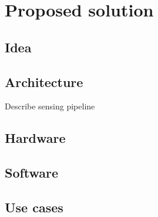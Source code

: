 
\chapter{Proposed solution}\label{chapter:proposed_solution}

	\section{Idea}

	\section{Architecture}
	
	Describe sensing pipeline 
	
	\section{Hardware}
	
	\section{Software}
	
	\section{Use cases}